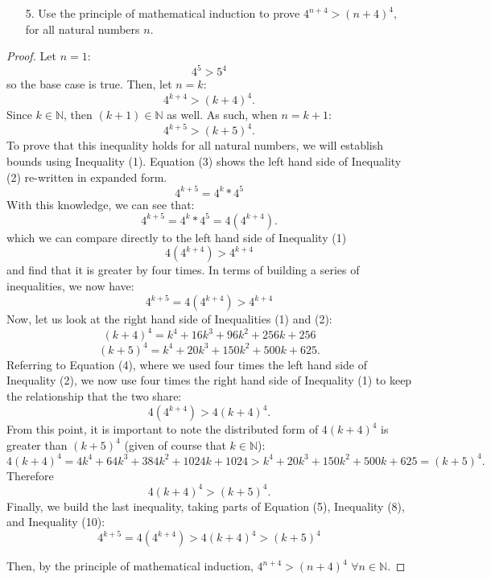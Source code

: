 \documentclass[10pt]{article}
\theoremstyle{definition}
\theoremstyle{definition}
\theoremstyle{plain}
\newcommand{\N}{\mathbb{N}}
\begin{document}
\pagebreak



\begin{enumerate}
\item[5.] Use the principle of mathematical induction to prove $4^{n+4} > (n+4)^4,$ for all natural numbers $n$.
\end{enumerate}

\begin{proof}
Let $n=1$:
$$4^5>5^4$$
so the base case is true.
Then, let $n=k$:
\setcounter{equation}{0}
\begin{equation}
4^{k+4} > (k+4)^4.
\end{equation}
Since $k\in\N$, then $(k+1)\in\N$ as well. As such, when $n=k+1$:
\begin{equation}
4^{k+5} > (k+5)^4.
\end{equation}
To prove that this inequality holds for all natural numbers, we will establish bounds using Inequality (1). Equation (3) shows the left hand side of Inequality (2) re-written in expanded form.
\begin{equation}
4^{k+5} = 4^k*4^5
\end{equation}
With this knowledge, we can see that:
\begin{equation}
4^{k+5} = 4^k*4^5 = 4(4^{k+4}).
\end{equation}
which we can compare directly to the left hand side of Inequality (1)
\begin{equation*}
4(4^{k+4}) > 4^{k+4}
\end{equation*}
and find that it is greater by four times. In terms of building a series of inequalities, we now have:
\begin{equation}
4^{k+5} = 4(4^{k+4}) > 4^{k+4}
\end{equation}
Now, let us look at the right hand side of Inequalities (1) and (2):
\begin{equation}
(k+4)^4 = k^4 + 16k^3 + 96k^2 + 256k + 256
\end{equation}
\begin{equation}
(k+5)^4 = k^4 + 20k^3 + 150k^2 + 500k + 625.
\end{equation}
Referring to Equation (4), where we used four times the left hand side of Inequality (2), we now use four times the right hand side of Inequality (1) to keep the relationship that the two share:
\begin{equation}
4(4^{k+4}) > 4(k+4)^4.
\end{equation}
From this point, it is important to note the distributed form of $4(k+4)^4$ is greater than $(k+5)^4$ (given of course that $k\in\N$):
\begin{equation}
4(k+4)^4 = 4k^4 + 64k^3 + 384k^2 + 1024k + 1024 > k^4 + 20k^3 + 150k^2 + 500k + 625 = (k+5)^4.
\end{equation}
Therefore
\begin{equation}
4(k+4)^4 > (k+5)^4.
\end{equation}
Finally, we build the last inequality, taking parts of Equation (5), Inequality (8), and Inequality (10):
\begin{equation}
4^{k+5} = 4(4^{k+4})>4(k+4)^4 > (k+5)^4
\end{equation}

Then, by the principle of mathematical induction, $4^{n+4} > (n+4)^4$ $\forall n\in\N$.
\end{proof}
\end{document}
